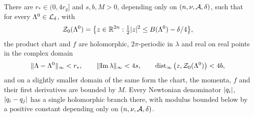 \begin{lemma}
\label{lem:domain}
There are $r_*\in(0,4r_g]$ and $s,b,M>0$, depending only on $(n,\nu,\mathcal{A},\delta)$, such that for every $\Lambda^0\in\mathcal{L}_\delta$, with
\begin{equation}
\label{eq:ball}
\mathcal Z_0(\Lambda^0)=\big\{z\in\mathbb{R}^{2n}:\tfrac12\lvert z\rvert^2\le B(\Lambda^0)-\delta/4\big\},
\end{equation}
the product chart and $f$ are holomorphic, $2\pi$-periodic in $\lambda$ and real on real points in the complex domain
\begin{equation}
\label{eq:domain}
\lVert \Lambda-\Lambda^0\rVert_\infty<r_*,\qquad \lVert \operatorname{Im}\lambda\rVert_\infty<4s,\qquad \operatorname{dist}_\infty\big(z,\mathcal Z_0(\Lambda^0)\big)<4b,
\end{equation}
and on a slightly smaller domain of the same form the chart, the momenta, $f$ and their first derivatives are bounded by $M$. Every Newtonian denominator $\lvert q_i\rvert$, $\lvert q_i-q_j\rvert$ has a single holomorphic branch there, with modulus bounded below by a positive constant depending only on $(n,\nu,\mathcal{A},\delta)$.
\end{lemma}

